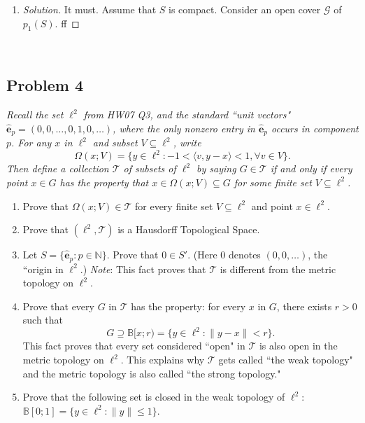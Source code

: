 \documentclass{article}
\newcommand{\N}{{\mathbb N}}
\newcommand{\R}{{\mathbb R}}
\begin{document}
\begin{enumerate}
\begin{proof}[Solution]
		We now prove that $p_1(S)$ is not closed.
		Note that $p_1(S) = \{2^{-n} \colon n \in \N\}$.
		See that $0 \in p_1(S)'$ but $0 \not\in p_1(S)$.
		The second of these is obvious, $0 < 2^{-n}$ for all $n \in \N$.
		To see that $0$ is a limit point,
		we have $\lim_{n\to\infty} 2^{-n} = 0$ (obviously, we are in $\R$),
		and $2^{-n} \in p_1(S)$ are distinct points,
		thus $0 \in p_1(S)'$ (by our proposition in metric spaces).
		Thus, $p_1(S) \neq p_1(S) \cup p_1(S)' = \overline{p_1(S)}$.
		But this is true only if $p_1(S)$ is not closed.
		Hence, $S$ is closed but $p_1(S)$ is not closed.
	\end{proof}
	\item \begin{proof}[Solution]\let\qed\relax
		It must. Assume that $S$ is compact.
		Consider an open cover $\mathcal{G}$ of $p_1(S)$.
		ff
	\end{proof}
\end{enumerate}
\clearpage
~\clearpage

\subsection*{Problem 4}
{\it Recall the set $\ell^2$ from HW07 Q3,
and the standard ``unit vectors" $\hat{\mathbf{e}}_p = (0,0,\dots,0,1,0,\dots)$,
where the only nonzero entry in $\hat{\mathbf{e}}_p$ occurs in component $p$.
For any $x$ in $\ell^2$ and subset $V \subseteq \ell^2$, write
\[
	\Omega(x;V) = \{y \in \ell^2 \colon -1 < \langle v,y-x\rangle<1, \forall v \in V\}.
\]
Then define a collection $\mathcal{T}$ of subsets of $\ell^2$ by saying
$G \in \mathcal{T}$ if and only if every point $x \in G$ has the property
that $x \in \Omega(x;V) \subseteq G$ for some \emph{finite set} $V \subseteq \ell^2$.
\begin{enumerate}
	\item Prove that $\Omega(x;V) \in \mathcal{T}$ for every finite set
		$V \subseteq \ell^2$ and point $x \in \ell^2$.
	\item Prove that $(\ell^2, \mathcal{T})$ is a Hausdorff Topological Space.
	\item Let $S = \{\hat{\mathbf{e}}_p \colon p \in \N\}$.
		Prove that $0 \in S'$.
		(Here $0$ denotes $(0,0,\dots)$, the ``origin in $\ell^2$.)
		\emph{Note}: This fact proves that $\mathcal{T}$ is
		different from the metric topology on $\ell^2$.
	\item Prove that every $G$ in $\mathcal{T}$ has the property:
		for every $x$ in $G$, there exists $r>0$ such that
		\[
			G \supseteq \mathbb{B}[x;r) = \{y \in \ell^2 \colon
			\lVert y - x \rVert < r\}.
		\]
		This fact proves that every set considered ``open" in $\mathcal{T}$
		is also open in the metric topology on $\ell^2$.
		This explains why $\mathcal{T}$ gets called ``the weak topology"
		and the metric topology is also called ``the strong topology."
	\item Prove that the following set is closed in the weak topology of $\ell^2$:
		$\mathbb{B}[0;1] = \{y \in \ell^2 \colon \lVert y \rVert \leq 1\}$.
\end{enumerate}}
\end{document}
